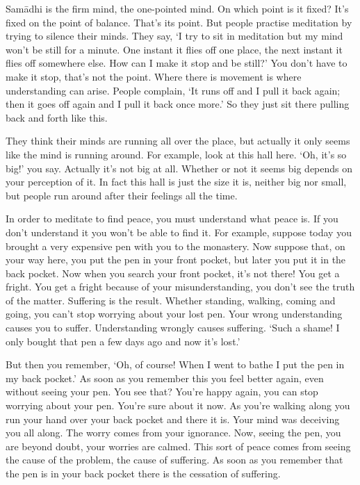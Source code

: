 Sam\=adhi is the firm mind, the one-pointed mind. On which point is it fixed? It's fixed on the point of balance. That's its point. But people practise meditation by trying to silence their minds. They say, `I try to sit in meditation but my mind won't be still for a minute. One instant it flies off one place, the next instant it flies off somewhere else. How can I make it stop and be still?' You don't have to make it stop, that's not the point. Where there is movement is where understanding can arise. People complain, `It runs off and I pull it back again; then it goes off again and I pull it back once more.' So they just sit there pulling back and forth like this.

They think their minds are running all over the place, but actually it only seems like the mind is running around. For example, look at this hall here. `Oh, it's so big!' you say. Actually it's not big at all. Whether or not it seems big depends on your perception of it. In fact this hall is just the size it is, neither big nor small, but people run around after their feelings all the time.

In order to meditate to find peace, you must understand what peace is. If you don't understand it you won't be able to find it. For example, suppose today you brought a very expensive pen with you to the monastery. Now suppose that, on your way here, you put the pen in your front pocket, but later you put it in the back pocket. Now when you search your front pocket, it's not there! You get a fright. You get a fright because of your misunderstanding, you don't see the truth of the matter. Suffering is the result. Whether standing, walking, coming and going, you can't stop worrying about your lost pen. Your wrong understanding causes you to suffer. Understanding wrongly causes suffering. `Such a shame! I only bought that pen a few days ago and now it's lost.'

But then you remember, `Oh, of course! When I went to bathe I put the pen in my back pocket.' As soon as you remember this you feel better again, even without seeing your pen. You see that? You're happy again, you can stop worrying about your pen. You're sure about it now. As you're walking along you run your hand over your back pocket and there it is. Your mind was deceiving you all along. The worry comes from your ignorance. Now, seeing the pen, you are beyond doubt, your worries are calmed. This sort of peace comes from seeing the cause of the problem,  the cause of suffering. As soon as you remember that the pen is in your back pocket there is  the cessation of suffering.


